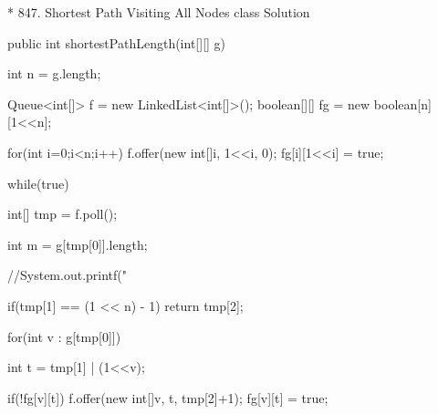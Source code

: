 * 847. Shortest Path Visiting All Nodes
		class Solution {
			public int shortestPathLength(int[][] g) {
				
				int n = g.length;
		
				Queue<int[]> f = new LinkedList<int[]>();
						boolean[][] fg = new boolean[n][1<<n];
		
				for(int i=0;i<n;i++){
					f.offer(new int[]{i, 1<<i, 0});
								fg[i][1<<i] = true;
				}
		
				while(true){
					int[] tmp = f.poll();
		
					int m = g[tmp[0]].length;
					
					//System.out.printf("%
		
					if(tmp[1] == (1 << n) - 1)
						return tmp[2];
		
					for(int v : g[tmp[0]]){
									int t = tmp[1] | (1<<v);
		
									if(!fg[v][t]){
										f.offer(new int[]{v, t, tmp[2]+1});
										fg[v][t] = true;
									}
					}
				}
		
			}
		}